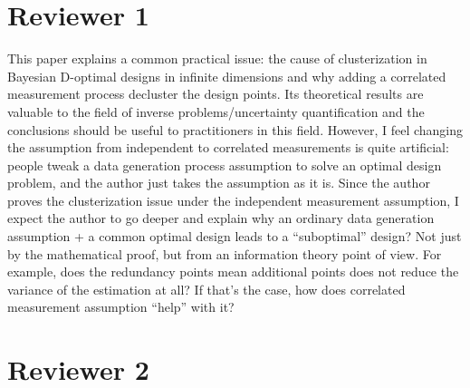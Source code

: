\documentclass{amsart}
\begin{document}
\section{Reviewer 1}
This paper explains a common practical issue: the cause of
clusterization in Bayesian D-optimal designs in infinite dimensions
and why adding a correlated measurement process decluster the design
points. Its theoretical results are valuable to the field of inverse
problems/uncertainty quantification and the conclusions should be
useful to practitioners in this field.  However, I feel changing the
assumption from independent to correlated measurements is quite
artificial: people tweak a data generation process assumption to solve
an optimal design problem, and the author just takes the assumption as
it is. Since the author proves the clusterization issue under the
independent measurement assumption, I expect the author to go deeper
and explain why an ordinary data generation assumption + a common
optimal design leads to a “suboptimal” design? Not just by the
mathematical proof, but from an information theory point of view. For
example, does the redundancy points mean additional points does not
reduce the variance of the estimation at all? If that’s the case, how
does correlated measurement assumption “help” with it?


\section{Reviewer 2}
\end{document}
